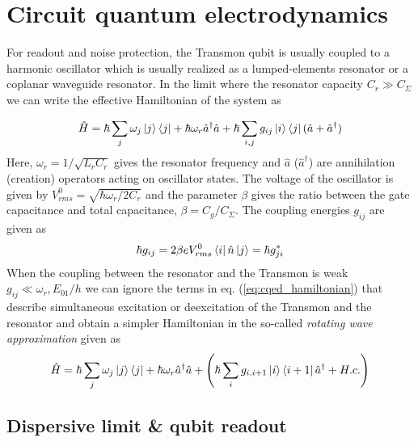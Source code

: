 \section{Circuit quantum electrodynamics}

For readout and noise protection, the Transmon qubit is usually coupled to a harmonic oscillator which is usually realized as a lumped-elements resonator or a coplanar waveguide resonator. In the limit where the resonator capacity $C_r \gg C_\Sigma$ we can write the effective Hamiltonian of the system as

\begin{equation}
\hat{H} = \hbar \sum\limits_j \omega_j \left| j \right>\left< j \right| + \hbar \omega_r \hat{a}^\dagger \hat{a} + \hbar \sum\limits_{i,j} g_{ij} \left| i \right>\left< j \right|(\hat{a}+\hat{a}^\dagger) \label{eq:cqed_hamiltonian}
\end{equation}
Here, $\omega_r = 1/\sqrt{L_r C_r}$ gives the resonator frequency and $\hat{a}$ ($\hat{a}^\dagger$) are annihilation (creation) operators acting on oscillator states. The voltage of the oscillator is given by $V_{rms}^0 = \sqrt{\hbar \omega_r / 2 C_r}$ and the parameter $\beta$ gives the ratio between the gate capacitance and total capacitance, $\beta = C_g/C_\Sigma$. The coupling energies $g_{ij}$ are given as
\begin{equation}
\hbar g_{ij} = 2\beta e V_{rms}^0 \left< i \right|\hat{n}\left| j \right> = \hbar g_{ji}^*
\end{equation}
When the coupling between the resonator and the Transmon is weak $g_{ij} \ll \omega_r,E_{01}/h$ we can ignore the terms in eq. (\ref{eq:cqed_hamiltonian}) that describe simultaneous excitation or deexcitation of the Transmon and the resonator and obtain a simpler Hamiltonian in the so-called {\it rotating wave approximation} given as
\begin{equation}
\hat{H} = \hbar \sum\limits_j \omega_j \left| j \right>\left< j \right|+\hbar \omega_r \hat{a}^\dagger \hat{a} + \left( \hbar \sum\limits_i g_{i,i+1} \left| i \right>\left< i+1 \right|\hat{a}^\dagger +H.c.\right)
\end{equation}

\subsection{Dispersive limit \& qubit readout}

